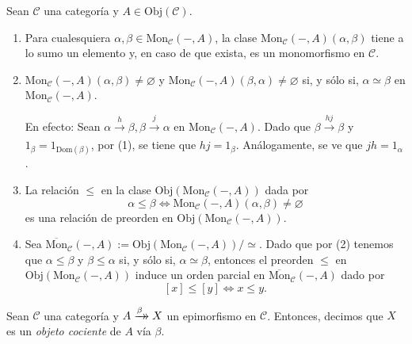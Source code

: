 \documentclass[tesis]{subfiles}
\begin{document}
\begin{Obs}\label{Mendoza-1.1.2}

    Sean $\mathscr{C}$ una categoría y $A\in\text{Obj}(\mathscr{C})$.

    \begin{enumerate}[label=(\arabic*)]
    
        \item Para cualesquiera $\alpha,\beta\in\text{Mon}_\mathscr{C}(-,A)$, la clase $\text{Mon}_\mathscr{C}(-,A)(\alpha,\beta)$ tiene a lo sumo un elemento y, en caso de que exista, es un monomorfismo en $\mathscr{C}$.

        \item $\text{Mon}_\mathscr{C}(-,A)(\alpha,\beta)\neq\varnothing$ y $\text{Mon}_\mathscr{C}(-,A)(\beta,\alpha)\neq\varnothing$ si, y sólo si, $\alpha\simeq\beta$ en $\text{Mon}_\mathscr{C}(-,A)$.

            En efecto: Sean $\alpha\xrightarrow[]{h} \beta, \beta\xrightarrow[]{j} \alpha$ en $\text{Mon}_\mathscr{C}(-,A)$. Dado que $\beta\xrightarrow[]{hj} \beta$ y $1_\beta=1_{\text{Dom}(\beta)}$, por (1), se tiene que $hj=1_\beta$. Análogamente, se ve que $jh=1_\alpha$.

        \item La relación $\leq$ en la clase $\text{Obj}(\text{Mon}_\mathscr{C}(-,A))$ dada por
            \[
                \alpha\leq\beta \iff \text{Mon}_\mathscr{C}(-,A)(\alpha,\beta)\neq\varnothing
            \] 
            es una relación de preorden en $\text{Obj}(\text{Mon}_\mathscr{C}(-,A))$.

        \item Sea $\overline{\text{Mon}}_\mathscr{C}(-,A):=\text{Obj}(\text{Mon}_\mathscr{C}(-,A))/\simeq$. Dado que por (2) tenemos que $\alpha\leq\beta$ y $\beta\leq\alpha$ si, y sólo si, $\alpha\simeq\beta$, entonces el preorden $\leq$ en $\text{Obj}(\text{Mon}_\mathscr{C}(-,A))$ induce un orden parcial en $\overline{\text{Mon}}_\mathscr{C}(-,A)$ dado por
            \[
                [x]\leq[y] \iff x\leq y.
            \] 
    \end{enumerate}
\end{Obs}


\begin{Def}\label{Def: Objeto cociente}
    Sean $\mathscr{C}$ una categoría y $A\xrightarrow[]{\beta}\mathrel{\mkern-14mu}\rightarrow X$ un epimorfismo en $\mathscr{C}$. Entonces, decimos que $X$ es un \emph{objeto cociente} de $A$ vía $\beta$.
\end{Def}
\end{document}
